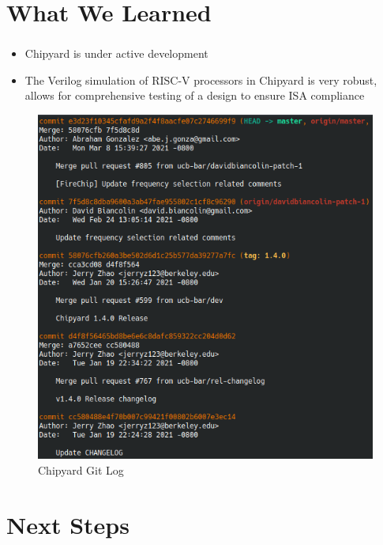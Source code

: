 \documentclass{eceday}
\begin{document}
\section{What We Learned}\label{sec:What_We_Learned}
\begin{frame}
  \frametitle{}
  \begin{itemize}
  \item Chipyard is under active development
  \item The Verilog simulation of RISC-V processors in Chipyard is very robust, allows for comprehensive testing of a design to ensure ISA compliance
  \end{itemize}

  \begin{figure}[h!tbp]
    \centering
    \includegraphics[scale=0.35]{./Chipyard_Active_Dev.png}
    \caption{Chipyard Git Log}
    \label{fig:Chipyard_Git_Log}
  \end{figure}
\end{frame}

\section{Next Steps}\label{sec:Next_Steps}
\end{document}
